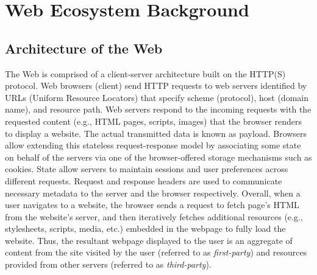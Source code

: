 \section{Web Ecosystem Background}
\label{sec:appendix-background}


\subsection{Architecture of the Web}
%
The Web is comprised of a client-server architecture built on the HTTP(S) protocol.
%
Web browsers (client) send HTTP requests to web servers identified by URLs (Uniform Resource Locators) that specify scheme (protocol), host (domain name), and resource path.
%
Web servers respond to the incoming requests with the requested content (e.g., HTML pages, scripts, images) that the browser renders to display a website.
%
The actual transmitted data is known as payload.
%
Browsers allow extending this stateless request-response model by associating some state on behalf of the servers via one of the browser-offered storage mechanisms such as cookies.
%
State allow servers to maintain sessions and user preferences across different requests.
%
Request and response headers are used to communicate necessary metadata to the server and the browser respectively.
%
Overall, when a user navigates to a website, the browser sends a request to fetch page's HTML from the website's server, and then iteratively fetches additional resources (e.g., stylesheets, scripts, media, etc.) embedded in the webpage to fully load the website.
%
Thus, the resultant webpage displayed to the user is an aggregate of content from the site visited by the user (referred to as \textit{first-party}) and resources provided from other servers (referred to as \textit{third-party}).



